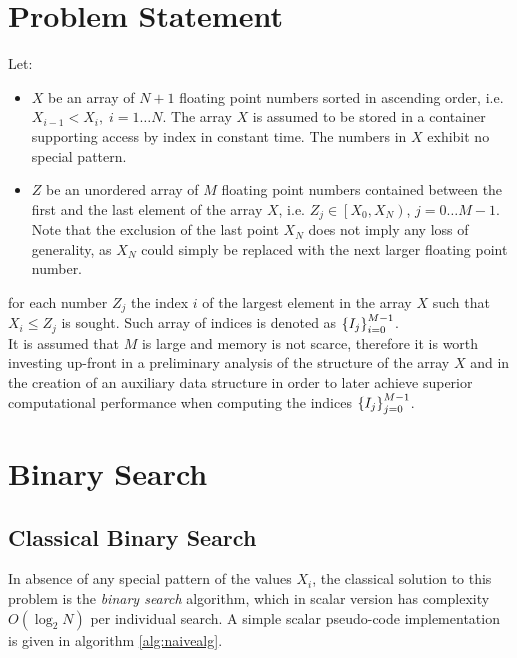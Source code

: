 \documentclass[preprint,1p,times]{elsarticle}
\begin{document}
\section{Problem Statement}
\label{sec:definition}
\noindent Let: 
\begin{itemize}
	\item $X$ be an array of $N+1$ floating point numbers sorted in ascending order, i.e. $X_{i-1}<X_{i}, \; i=1 \dots N$.
	The array $X$ is assumed to be stored in a container supporting access by index in constant time. The numbers in $X$ exhibit no special pattern.
	\item $Z$ be an unordered array of $M$ floating point numbers contained between the first and the last element of the array $X$, i.e. $Z_j \in \left[X_0, X_N \right)$, $j=0 \dots M-1$. Note that the exclusion of the last point $X_N$ does not imply any loss of generality, as $X_N$ could simply be replaced with the next larger floating point number.
\end{itemize}
for each number $Z_j$ the index $i$ of the largest element in the array $X$ such that $X_i \leq Z_j$ is sought. Such array of indices is denoted as $\left \{ I_j \right \}_{i=0}^{M-1}$. \\

It is assumed that $M$ is large and memory is not scarce, therefore it is worth investing up-front in a preliminary analysis of the structure of the array $X$ and in the creation of an auxiliary data structure in order to later achieve superior computational performance when computing the indices $\left \{ I_j \right \}_{j=0}^{M-1}$.

\section{Binary Search}

\subsection{Classical Binary Search}
\label{sec:binary}

In absence of any special pattern of the values $X_i$, the classical solution to this problem is the \textit{binary search} algorithm, 
which in scalar version has complexity $O( \log_2 N )$ per individual search.
A simple scalar pseudo-code implementation is given in algorithm \ref{alg:naivealg}.
\end{document}
